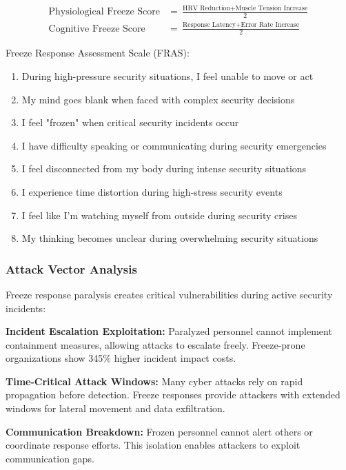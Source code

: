 \documentclass[11pt,a4paper]{article}
\begin{document}
\begin{align}
\text{Physiological Freeze Score} &= \frac{\text{HRV Reduction} + \text{Muscle Tension Increase}}{2} \\
\text{Cognitive Freeze Score} &= \frac{\text{Response Latency} + \text{Error Rate Increase}}{2}
\end{align}

Freeze Response Assessment Scale (FRAS):

\begin{enumerate}
\item During high-pressure security situations, I feel unable to move or act
\item My mind goes blank when faced with complex security decisions
\item I feel "frozen" when critical security incidents occur
\item I have difficulty speaking or communicating during security emergencies
\item I feel disconnected from my body during intense security situations
\item I experience time distortion during high-stress security events
\item I feel like I'm watching myself from outside during security crises
\item My thinking becomes unclear during overwhelming security situations
\end{enumerate}

\subsubsection{Attack Vector Analysis}

Freeze response paralysis creates critical vulnerabilities during active security incidents:

\textbf{Incident Escalation Exploitation:} Paralyzed personnel cannot implement containment measures, allowing attacks to escalate freely. Freeze-prone organizations show 345\% higher incident impact costs\cite{escalation2023}.

\textbf{Time-Critical Attack Windows:} Many cyber attacks rely on rapid propagation before detection. Freeze responses provide attackers with extended windows for lateral movement and data exfiltration\cite{timing2022}.

\textbf{Communication Breakdown:} Frozen personnel cannot alert others or coordinate response efforts. This isolation enables attackers to exploit communication gaps\cite{communication2021}.
\end{document}

